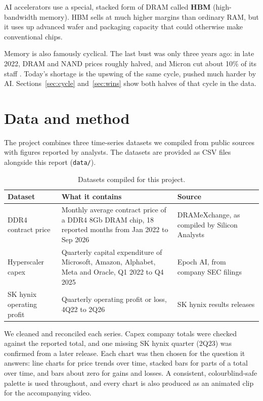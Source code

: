 \documentclass[11pt]{article}
\begin{document}
AI accelerators use a special, stacked form of DRAM called \textbf{HBM} (high-bandwidth memory). HBM sells at much higher margins than ordinary RAM, but it uses up advanced wafer and packaging capacity that could otherwise make conventional chips.

Memory is also famously cyclical. The last bust was only three years ago: in late 2022, DRAM and NAND prices roughly halved, and Micron cut about 10\% of its staff \cite{dcd}. Today's shortage is the upswing of the same cycle, pushed much harder by AI. Sections~\ref{sec:cycle} and~\ref{sec:wins} show both halves of that cycle in the data.

\section{Data and method}

The project combines three time-series datasets we compiled from public sources with figures reported by analysts. The datasets are provided as CSV files alongside this report (\texttt{data/}).

\begin{table}[h]
  \centering\small
  \begin{tabularx}{\linewidth}{@{}p{3.6cm}Xp{3.4cm}@{}}
    \toprule
    \textbf{Dataset} & \textbf{What it contains} & \textbf{Source} \\
    \midrule
    DDR4 contract price & Monthly average contract price of a DDR4 8Gb DRAM chip, 18 reported months from Jan 2022 to Sep 2026 & DRAMeXchange, as compiled by Silicon Analysts \cite{silicon} \\
    \addlinespace
    Hyperscaler capex & Quarterly capital expenditure of Microsoft, Amazon, Alphabet, Meta and Oracle, Q1 2022 to Q4 2025 & Epoch AI, from company SEC filings \cite{epoch} \\
    \addlinespace
    SK hynix operating profit & Quarterly operating profit or loss, 4Q22 to 2Q26 & SK hynix results releases \cite{skhynix} \\
    \bottomrule
  \end{tabularx}
  \caption{Datasets compiled for this project.}
  \label{tab:data}
\end{table}

We cleaned and reconciled each series. Capex company totals were checked against the reported total, and one missing SK hynix quarter (2Q23) was confirmed from a later release. Each chart was then chosen for the question it answers: line charts for price trends over time, stacked bars for parts of a total over time, and bars about zero for gains and losses. A consistent, colourblind-safe palette is used throughout, and every chart is also produced as an animated clip for the accompanying video.
\end{document}
